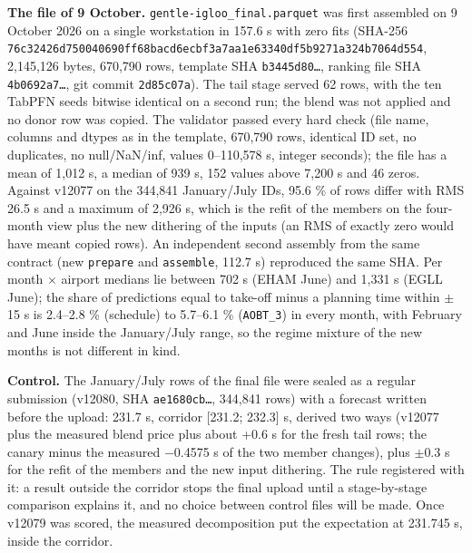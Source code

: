 \documentclass[
  manuscript=article,  %
  layout=preprint,     %
  year=2026,
  volume=4,
]{extra/joas}
\begin{document}
\textbf{The file of 9 October.} \texttt{gentle-igloo\_\allowbreak{}final.parquet} was first assembled on 9 October 2026 on a single workstation in 157.6 s with zero fits (SHA-256 \texttt{76c32426d750040690ff68bacd6ecbf3a7aa1e63340df5b9271a324b7064d554}, 2,145,126 bytes, 670,790 rows, template SHA \texttt{b3445d80\ldots{}}, ranking file SHA \texttt{4b0692a7\ldots{}}, git commit \texttt{2d85c07a}). The tail stage served 62 rows, with the ten TabPFN seeds bitwise identical on a second run; the blend was not applied and no donor row was copied. The validator passed every hard check (file name, columns and dtypes as in the template, 670,790 rows, identical ID set, no duplicates, no null/NaN/inf, values 0--110,578 s, integer seconds); the file has a mean of 1,012 s, a median of 939 s, 152 values above 7,200 s and 46 zeros. Against v12077 on the 344,841 January/July IDs, 95.6 \% of rows differ with RMS 26.5 s and a maximum of 2,926 s, which is the refit of the members on the four-month view plus the new dithering of the inputs (an RMS of exactly zero would have meant copied rows). An independent second assembly from the same contract (new \texttt{prepare} and \texttt{assemble}, 112.7 s) reproduced the same SHA. Per month $\times$ airport medians lie between 702 s (EHAM June) and 1,331 s (EGLL June); the share of predictions equal to take-off minus a planning time within $\pm$15 s is 2.4--2.8 \% (schedule) to 5.7--6.1 \% (\texttt{AOBT\_\allowbreak{}3}) in every month, with February and June inside the January/July range, so the regime mixture of the new months is not different in kind.

\textbf{Control.} The January/July rows of the final file were sealed as a regular submission (v12080, SHA \texttt{ae1680cb\ldots{}}, 344,841 rows) with a forecast written before the upload: 231.7 s, corridor {[}231.2; 232.3{]} s, derived two ways (v12077 plus the measured blend price plus about +0.6 s for the fresh tail rows; the canary minus the measured $-$0.4575 s of the two member changes), plus $\pm$0.3 s for the refit of the members and the new input dithering. The rule registered with it: a result outside the corridor stops the final upload until a stage-by-stage comparison explains it, and no choice between control files will be made. Once v12079 was scored, the measured decomposition put the expectation at 231.745 s, inside the corridor.
\end{document}
